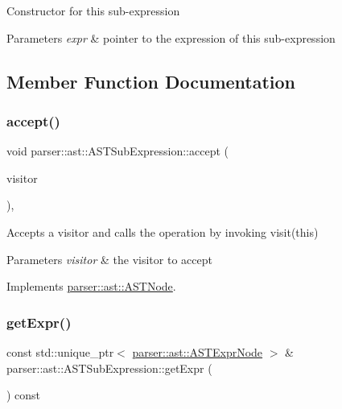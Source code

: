 Constructor for this sub-\/expression 
\begin{DoxyParams}{Parameters}
{\em expr} & pointer to the expression of this sub-\/expression \\
\hline
\end{DoxyParams}


\subsection{Member Function Documentation}
\mbox{\label{classparser_1_1ast_1_1ASTSubExpression_a684e39e8385690e9bade65731ba5803b}} 
\subsubsection{\texorpdfstring{accept()}{accept()}}
{\footnotesize\ttfamily void parser\+::ast\+::\+A\+S\+T\+Sub\+Expression\+::accept (\begin{DoxyParamCaption}\item[{\hyperlink{classvisitor_1_1Visitor}{visitor\+::\+Visitor} $\ast$}]{visitor }\end{DoxyParamCaption})\hspace{0.3cm}{\ttfamily [override]}, {\ttfamily [virtual]}}

Accepts a visitor and calls the operation by invoking {\ttfamily visit(this)} 
\begin{DoxyParams}{Parameters}
{\em visitor} & the visitor to accept \\
\hline
\end{DoxyParams}


Implements \hyperlink{classparser_1_1ast_1_1ASTNode_a3ff84fdfdbbc5c39b70b4d04c22e7dc3}{parser\+::ast\+::\+A\+S\+T\+Node}.

\mbox{\label{classparser_1_1ast_1_1ASTSubExpression_ab25ef09e54236f4e10e944b09cb23935}} 
\subsubsection{\texorpdfstring{get\+Expr()}{getExpr()}}
{\footnotesize\ttfamily const std\+::unique\+\_\+ptr$<$ \hyperlink{classparser_1_1ast_1_1ASTExprNode}{parser\+::ast\+::\+A\+S\+T\+Expr\+Node} $>$ \& parser\+::ast\+::\+A\+S\+T\+Sub\+Expression\+::get\+Expr (\begin{DoxyParamCaption}{ }\end{DoxyParamCaption}) const}

